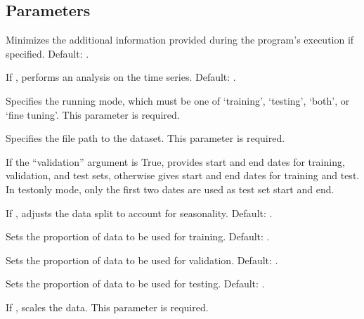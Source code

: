 \documentclass[letterpaper,10pt,english]{sphinxmanual}
\begin{document}
\subsection{Parameters}
\label{\detokenize{docs/parser_arguments:parameters}}\begin{description}
\sphinxAtStartPar
Minimizes the additional information provided during the program’s execution if specified. Default: .

\sphinxAtStartPar
If , performs an analysis on the time series. Default: .

\sphinxAtStartPar
Specifies the running mode, which must be one of ‘training’, ‘testing’, ‘both’, or ‘fine tuning’. This parameter is required.

\sphinxAtStartPar
Specifies the file path to the dataset. This parameter is required.

\sphinxAtStartPar
If the “\textendash{}validation” argument is True, provides start and end dates for training, validation, and test sets, otherwise gives start and end dates for training and test.
In test\sphinxhyphen{}only mode, only the first two dates are used as test set start and end.

\sphinxAtStartPar
If , adjusts the data split to account for seasonality. Default: .

\sphinxAtStartPar
Sets the proportion of data to be used for training. Default: .

\sphinxAtStartPar
Sets the proportion of data to be used for validation. Default: .

\sphinxAtStartPar
Sets the proportion of data to be used for testing. Default: .

\sphinxAtStartPar
If , scales the data. This parameter is required.


\end{description}
\end{document}
